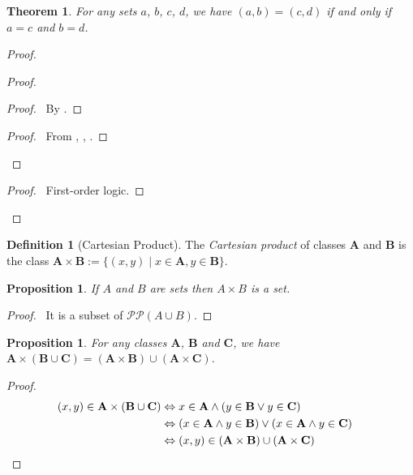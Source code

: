 \documentclass{book}
\let\qed\relax
\newtheorem{prop}[ax]{Proposition}
\newtheorem{thm}[ax]{Theorem}
\theoremstyle{definition}
\newtheorem{df}[ax]{Definition}
\begin{document}
\begin{thm}
For any sets $a$, $b$, $c$, $d$, we have $(a,b) = (c,d)$ if and only if $a = c$ and $b = d$.
\end{thm}

\begin{proof}
\pf
{}
\begin{proof}
	\begin{proof}
		\pf\ By .
	\end{proof}
	\begin{proof}
		\pf\ From , , .
	\end{proof}
\end{proof}
\begin{proof}
	\pf\ First-order logic.
\end{proof}
\qed
\end{proof}

\begin{df}[Cartesian Product]
The \emph{Cartesian product} of classes $\mathbf{A}$ and $\mathbf{B}$ is the class $\mathbf{A} \times \mathbf{B} := \{(x,y) \mid x \in \mathbf{A}, y \in \mathbf{B}\}$.
\end{df}

\begin{prop}
If $A$ and $B$ are sets then $A \times B$ is a set.
\end{prop}

\begin{proof}
\pf\ It is a subset of $\mathcal{P} \mathcal{P} (A \cup B)$. \qed
\end{proof}

\begin{prop}
For any classes $\mathbf{A}$, $\mathbf{B}$ and $\mathbf{C}$, we have $\mathbf{A} \times (\mathbf{B} \cup \mathbf{C}) = (\mathbf{A} \times \mathbf{B}) \cup (\mathbf{A} \times \mathbf{C})$.
\end{prop}

\begin{proof}
\pf
\begin{align*}
(x,y) \in \mathbf{A} \times (\mathbf{B} \cup \mathbf{C}) & \Leftrightarrow x \in \mathbf{A} \wedge (y \in \mathbf{B} \vee y \in \mathbf{C}) \\
& \Leftrightarrow (x \in \mathbf{A} \wedge y \in \mathbf{B}) \vee (x \in \mathbf{A} \wedge y \in \mathbf{C}) \\
& \Leftrightarrow (x,y) \in (\mathbf{A} \times \mathbf{B}) \cup (\mathbf{A} \times \mathbf{C}) & \qed
\end{align*}
\end{proof}
\end{document}
